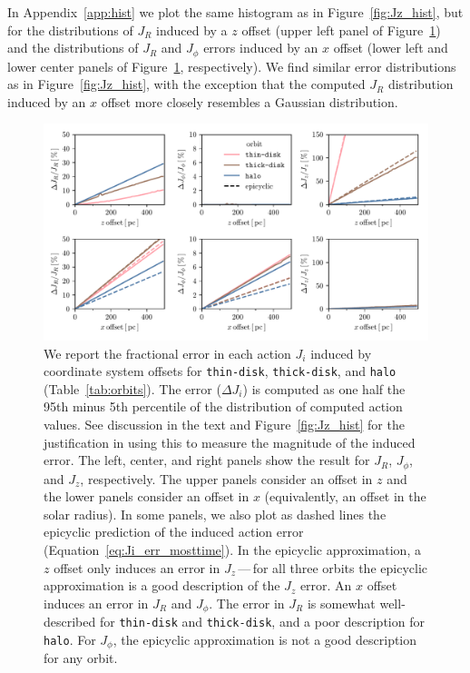 \documentclass[twocolumn]{aastex62}
\newcommand{\thin}{\texttt{thin-disk}}
\newcommand{\thick}{\texttt{thick-disk}}
\newcommand{\halo}{\texttt{halo}}
\begin{document}
In Appendix~\ref{app:hist} we plot the same histogram as in
Figure~\ref{fig:Jz_hist}, but for the distributions of $J_R$ induced by a $z$
offset (upper left panel of Figure~\ref{fig:many_orbit_wrong_ref}) and the
distributions of $J_R$ and $J_{\phi}$ errors induced by an $x$ offset (lower
left and lower center panels of Figure~\ref{fig:many_orbit_wrong_ref},
respectively). We find similar error distributions as in
Figure~\ref{fig:Jz_hist}, with the exception that the computed $J_R$
distribution induced by an $x$ offset more closely resembles a Gaussian
distribution.

\begin{figure}[htb!]
\begin{center}
\includegraphics[width=\textwidth]{fig/schmactions_many_orbits.pdf}
\end{center}
\caption{We report the fractional error in each action $J_i$ induced by
coordinate system offsets for \thin{}, \thick{}, and \halo{}
(Table~\ref{tab:orbits}). The error ($\Delta J_i$) is computed as one half the
95th minus 5th percentile of the distribution of computed action values. See
discussion in the text and Figure~\ref{fig:Jz_hist} for the justification in
using this to measure the magnitude of the induced error. The left, center,
and right panels show the result for $J_R$, $J_{\phi}$, and $J_z$,
respectively. The upper panels consider an offset in $z$ and the lower panels
consider an offset in $x$ (equivalently, an offset in the solar radius). In
some panels, we also plot as dashed lines the epicyclic prediction of the
induced action error (Equation~\eqref{eq:Ji_err_mosttime}). In the epicyclic
approximation, a $z$ offset only induces an error in $J_z$\,---\,for all three
orbits the epicyclic approximation is a good description of the $J_z$ error.
An $x$ offset induces an error in $J_R$ and $J_{\phi}$. The error in $J_R$ is
somewhat well-described for \thin{} and \thick{}, and a poor description for
\halo{}. For $J_{\phi}$, the epicyclic approximation is not a good description
for any orbit.}
\label{fig:many_orbit_wrong_ref}
\end{figure}
\end{document}
